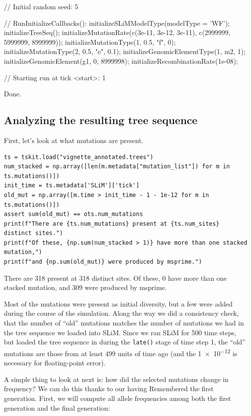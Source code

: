 \documentclass[12pt]{article}
\begin{document}
\begin{pycon}
    // Initial random seed:
    5
    
    // RunInitializeCallbacks():
    initializeSLiMModelType(modelType = 'WF');
    initializeTreeSeq();
    initializeMutationRate(c(3e-11, 3e-12, 3e-11), c(2999999, 5999999, 8999999));
    initializeMutationType(1, 0.5, "f", 0);
    initializeMutationType(2, 0.5, "e", 0.1);
    initializeGenomicElementType(1, m2, 1);
    initializeGenomicElement(g1, 0, 8999998);
    initializeRecombinationRate(1e-08);
    
    // Starting run at tick <start>:
    1 
    
    Done.
\end{pycon}

\subsection*{Analyzing the resulting tree sequence}

First, let’s look at what mutations are present.
\begin{lstlisting}
ts = tskit.load("vignette_annotated.trees")
num_stacked = np.array([len(m.metadata["mutation_list"]) for m in ts.mutations()])
init_time = ts.metadata['SLiM']['tick']
old_mut = np.array([m.time > init_time - 1 - 1e-12 for m in ts.mutations()])
assert sum(old_mut) == ots.num_mutations
print(f"There are {ts.num_mutations} present at {ts.num_sites} distinct sites.")
print(f"Of these, {np.sum(num_stacked > 1)} have more than one stacked mutation,")
print(f"and {np.sum(old_mut)} were produced by msprime.")
\end{lstlisting}
\begin{pycon}
There are 318 present at 318 distinct sites.
Of these, 0 have more than one stacked mutation,
and 309 were produced by msprime.
\end{pycon}

Most of the mutations were present as initial diversity,
but a few were added during the course of the simulation.
Along the way we did a consistency check,
that the number of “old” mutations matches the number of mutations we had in the tree sequence we loaded into SLiM.
Since we ran SLiM for 500 time steps,
but loaded the tree sequence in during the \verb|late()| stage of time step 1,
the “old” mutations are those from at least 499 units of time ago
(and the \num{1e-12} is necessary for floating-point error).

A simple thing to look at next is:
how did the selected mutations change in frequency?
We can do this thanks to our having Remembered the first generation.
First, we will compute all allele frequencies among both the first generation and the final generation:
\end{document}
